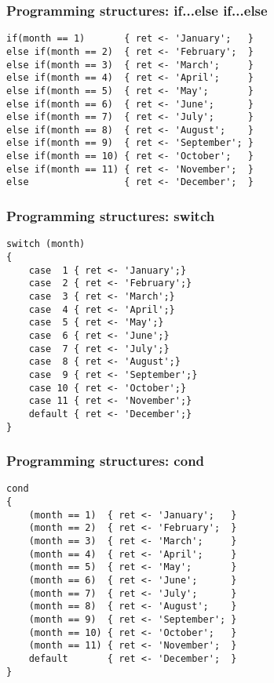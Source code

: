 \documentclass[11pt]{beamer}
\begin{document}
\begin{frame}[fragile]
\frametitle{Programming structures: if...else if...else}
\small
\begin{lstlisting}[language=lekta]
if(month == 1)       { ret <- 'January';   }
else if(month == 2)  { ret <- 'February';  }
else if(month == 3)  { ret <- 'March';     }
else if(month == 4)  { ret <- 'April';     }
else if(month == 5)  { ret <- 'May';       }
else if(month == 6)  { ret <- 'June';      }
else if(month == 7)  { ret <- 'July';      }
else if(month == 8)  { ret <- 'August';    }
else if(month == 9)  { ret <- 'September'; }
else if(month == 10) { ret <- 'October';   }
else if(month == 11) { ret <- 'November';  }
else                 { ret <- 'December';  }
\end{lstlisting}
\end{frame}

\begin{frame}[fragile]
\frametitle{Programming structures: switch}
\small
\begin{lstlisting}[language=lekta]
switch (month) 
{
	case  1 { ret <- 'January';}
	case  2 { ret <- 'February';}
	case  3 { ret <- 'March';}
	case  4 { ret <- 'April';}
	case  5 { ret <- 'May';}
	case  6 { ret <- 'June';}
	case  7 { ret <- 'July';}
	case  8 { ret <- 'August';}
	case  9 { ret <- 'September';}
	case 10 { ret <- 'October';}
	case 11 { ret <- 'November';}
	default { ret <- 'December';}
}
\end{lstlisting}
\end{frame}

\begin{frame}[fragile]
\frametitle{Programming structures: cond}
\small
\begin{lstlisting}[language=lekta]
cond
{
	(month == 1)  { ret <- 'January';   }
	(month == 2)  { ret <- 'February';  }
	(month == 3)  { ret <- 'March';     }
	(month == 4)  { ret <- 'April';     }
	(month == 5)  { ret <- 'May';       }
	(month == 6)  { ret <- 'June';      }
	(month == 7)  { ret <- 'July';      }
	(month == 8)  { ret <- 'August';    }
	(month == 9)  { ret <- 'September'; }
	(month == 10) { ret <- 'October';   }
	(month == 11) { ret <- 'November';  }
	default       { ret <- 'December';  }
}
\end{lstlisting}
\end{frame}
\end{document}
